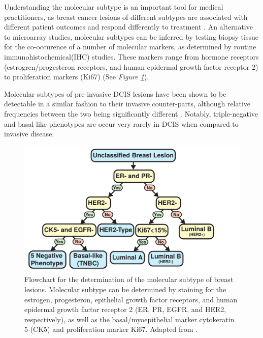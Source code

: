 Understanding the molecular subtype is an important tool for medical practitioners, as breast cancer lesions of different subtypes are associated with different patient outcomes and respond differently to treatment \citep{engstrom2013,rouzier2005}. An alternative to microarray studies, molecular subtypes can be inferred by testing biopsy tissue for the co-occurence of a number of molecular markers, as determined by routine immunohistochemical(IHC) studies. These markers range from hormone receptors (estrogren/progesteron receptors, and human epidermal growth factor receptor 2) to proliferation markers (Ki67) (See \emph{Figure \ref{subtype_flowchart}}).

Molecular subtypes of pre-invasive DCIS lesions have been shown to be detectable in a similar fashion to their invasive counter-parts, although relative frequencies between the two being significantly different \citep{tamimi2008,clark2011}. Notably, triple-negative and basal-like phenotypes are occur very rarely in DCIS when compared to invasive disease.

\begin{figure}[ht!]
	\centering
	\includegraphics[width=150mm]{figures/subtype_flowchart.pdf}
	\caption{Flowchart for the determination of the molecular subtype of breast lesions. Molecular subtype can be determined by staining for the estrogen, progesteron, epithelial growth factor receptors, and human epidermal growth factor receptor 2 (ER, PR, EGFR, and HER2, respectively), as well as the basal/myoepithelial marker cytokeratin 5 (CK5) and proliferation marker Ki67. Adapted from \cite{engstrom2013}. \label{subtype_flowchart}}
\end{figure}